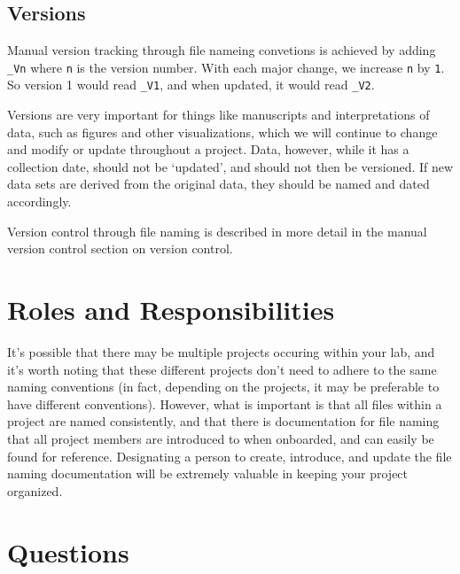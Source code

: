 \documentclass[
]{book}
\begin{document}
\hypertarget{versions-1}{%
\subsection*{Versions}\label{versions-1}}

Manual version tracking through file nameing convetions is achieved by adding \texttt{\_Vn} where \texttt{n} is the version number. With each major change, we increase \texttt{n} by \texttt{1}. So version 1 would read \texttt{\_V1}, and when updated, it would read \texttt{\_V2}.

Versions are very important for things like manuscripts and interpretations of data, such as figures and other visualizations, which we will continue to change and modify or update throughout a project. Data, however, while it has a collection date, should not be `updated', and should not then be versioned. If new data sets are derived from the original data, they should be named and dated accordingly.

Version control through file naming is described in more detail in the manual version control section on version control.

\hypertarget{roles-and-responsibilities-5}{%
\section*{Roles and Responsibilities}\label{roles-and-responsibilities-5}}

It's possible that there may be multiple projects occuring within your lab, and it's worth noting that these different projects don't need to adhere to the same naming conventions (in fact, depending on the projects, it may be preferable to have different conventions). However, what is important is that all files within a project are named consistently, and that there is documentation for file naming that all project members are introduced to when onboarded, and can easily be found for reference. Designating a person to create, introduce, and update the file naming documentation will be extremely valuable in keeping your project organized.

\hypertarget{questions-7}{%
\section*{Questions}\label{questions-7}}
\end{document}
